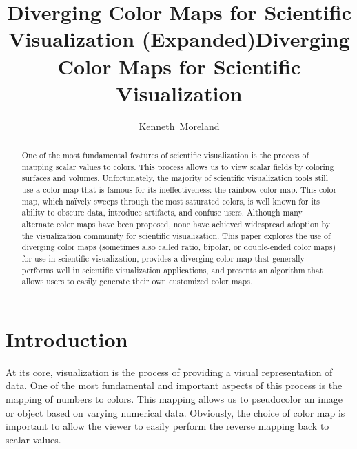 \documentclass{llncs}
\title{Diverging Color Maps for Scientific Visualization (Expanded)}
\title{Diverging Color Maps for Scientific Visualization}
\author{Kenneth~Moreland}
\institute{Sandia National Laboratories}
\begin{document}
\sloppy

\maketitle

\begin{abstract}
  One of the most fundamental features of scientific visualization is the
  process of mapping scalar values to colors.  This process allows us to
  view scalar fields by coloring surfaces and volumes.  Unfortunately, the
  majority of scientific visualization tools still use a color map that is
  famous for its ineffectiveness: the rainbow color map.  This color map,
  which na\"{i}vely sweeps through the most saturated colors, is well known
  for its ability to obscure data, introduce artifacts, and confuse users.
  Although many alternate color maps have been proposed, none have achieved
  widespread adoption by the visualization community for scientific
  visualization.  This paper explores the use of diverging color maps
  (sometimes also called ratio, bipolar, or double-ended color maps) for
  use in scientific visualization, provides a diverging color map that
  generally performs well in scientific visualization applications, and
  presents an algorithm that allows users to easily generate their own
  customized color maps.
\end{abstract}

\section{Introduction}
\label{sec:Introduction}

At its core, visualization is the process of providing a visual
representation of data.  One of the most fundamental and important aspects
of this process is the mapping of numbers to colors.  This mapping allows
us to pseudocolor an image or object based on varying numerical data.
Obviously, the choice of color map is important to allow the viewer to
easily perform the reverse mapping back to scalar values.

\end{document}
